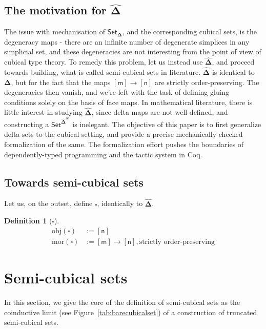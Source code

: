\documentclass[10pt]{amsart}
\newtheorem{definition}{Definition}
\newcommand{\BDelta}{\ensuremath{\boldsymbol{\Delta}}}
\newcommand{\DeltaHat}{\ensuremath{\hat{\boldsymbol{\Delta}}}}
\newcommand{\SSet}{\ensuremath{\mathsf{Set}_{\boldsymbol{\Delta}}}}
\newcommand{\Set}{\ensuremath{\mathsf{Set}}}
\newcommand{\sq}[1]{\ensuremath{\mathsf{[#1]}}}
\newcommand{\Cube}{\ensuremath{\boldsymbol{\square}}}
\begin{document}
\subsection{The motivation for \texorpdfstring{\DeltaHat}{delta sets}}

The issue with mechanisation of \SSet, and the corresponding cubical sets, is the degeneracy maps - there are an infinite number of degenerate simplices in any simplicial set, and these degeneracies are not interesting from the point of view of cubical type theory. To remedy this problem, let us instead use \DeltaHat, and proceed towards building, what is called semi-cubical sets in literature. $\DeltaHat$ is identical to \BDelta, but for the fact that the maps $\sq{m} \rightarrow \sq{n}$ are strictly order-preserving. The degeneracies then vanish, and we're left with the task of defining gluing conditions solely on the basis of face maps. In mathematical literature, there is little interest in studying \DeltaHat, since delta maps are not well-defined, and constructing a $\Set^{\DeltaHat^{op}}$ is inelegant. The objective of this paper is to first generalize delta-sets to the cubical setting, and provide a precise mechanically-checked formalization of the same. The formalization effort pushes the boundaries of dependently-typed programming and the tactic system in Coq.

\subsection{Towards semi-cubical sets}

Let us, on the outset, define \Cube, identically to \DeltaHat.

\begin{definition}[\Cube]
  \begin{align*}
    \text{obj}(\Cube) & := \sq{n}                                                      \\
    \text{mor}(\Cube) & := \sq{m} \rightarrow \sq{n}, \text{strictly order-preserving}
  \end{align*}
\end{definition}

\section{Semi-cubical sets}

In this section, we give the core of the definition of semi-cubical
sets as the coinductive limit (see Figure~\ref{tab:barecubicalset}) of a
construction of truncated semi-cubical sets.
\end{document}
